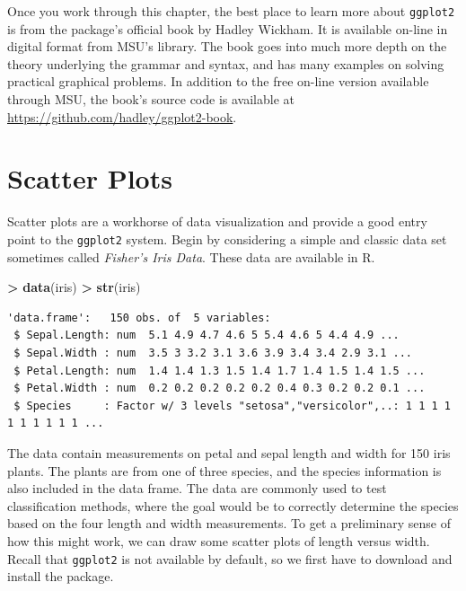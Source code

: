 \documentclass[
]{krantz}
\makeatletter
\newenvironment{Shaded}{\begin{snugshade}}{\end{snugshade}}
\newcommand{\KeywordTok}[1]{\textcolor[rgb]{0.27,0.27,0.27}{\textbf{#1}}}
\newcommand{\NormalTok}[1]{#1}
\newcommand{\OperatorTok}[1]{\textcolor[rgb]{0.43,0.43,0.43}{\textbf{#1}}}
\newcommand{\StringTok}[1]{\textcolor[rgb]{0.5,0.5,0.5}{#1}}
\newenvironment{kframe}{%
\medskip{}
\setlength{\fboxsep}{.8em}
 \def\at@end@of@kframe{}%
 \ifinner\ifhmode%
  \def\at@end@of@kframe{\end{minipage}}%
  \begin{minipage}{\columnwidth}%
 \fi\fi%
 \def\FrameCommand##1{\hskip\@totalleftmargin \hskip-\fboxsep
 \colorbox{shadecolor}{##1}\hskip-\fboxsep
     \hskip-\linewidth \hskip-\@totalleftmargin \hskip\columnwidth}%
 \MakeFramed {\advance\hsize-\width
   \@totalleftmargin\z@ \linewidth\hsize
   \@setminipage}}%
 {\par\unskip\endMakeFramed%
 \at@end@of@kframe}
\renewenvironment{Shaded}{\begin{kframe}}{\end{kframe}}
\makeatother
\begin{document}
Once you work through this chapter, the best place to learn more about \texttt{ggplot2} is from the package's official book \citet{WickhamGgplot2Book} by Hadley Wickham. It is available on-line in digital format from MSU's library. The book goes into much more depth on the theory underlying the grammar and syntax, and has many examples on solving practical graphical problems. In addition to the free on-line version available through MSU, the book's source code is available at \url{https://github.com/hadley/ggplot2-book}.

\hypertarget{scatter-plots}{%
\section{Scatter Plots}\label{scatter-plots}}

Scatter plots are a workhorse of data visualization and provide a good entry point to the \texttt{ggplot2} system. Begin by considering a simple and classic data set sometimes called \emph{Fisher's Iris Data}. These data are available in R.

\begin{Shaded}
\begin{Highlighting}[]
\OperatorTok{\textgreater{}}\StringTok{ }\KeywordTok{data}\NormalTok{(iris)}
\OperatorTok{\textgreater{}}\StringTok{ }\KeywordTok{str}\NormalTok{(iris)}
\end{Highlighting}
\end{Shaded}

\begin{verbatim}
'data.frame':   150 obs. of  5 variables:
 $ Sepal.Length: num  5.1 4.9 4.7 4.6 5 5.4 4.6 5 4.4 4.9 ...
 $ Sepal.Width : num  3.5 3 3.2 3.1 3.6 3.9 3.4 3.4 2.9 3.1 ...
 $ Petal.Length: num  1.4 1.4 1.3 1.5 1.4 1.7 1.4 1.5 1.4 1.5 ...
 $ Petal.Width : num  0.2 0.2 0.2 0.2 0.2 0.4 0.3 0.2 0.2 0.1 ...
 $ Species     : Factor w/ 3 levels "setosa","versicolor",..: 1 1 1 1 1 1 1 1 1 1 ...
\end{verbatim}

The data contain measurements on petal and sepal length and width for 150 iris plants. The plants are from one of three species, and the species information is also included in the data frame. The data are commonly used to test classification methods, where the goal would be to correctly determine the species based on the four length and width measurements. To get a preliminary sense of how this might work, we can draw some scatter plots of length versus width. Recall that \texttt{ggplot2} is not available by default, so we first have to download and install the package.
\end{document}
